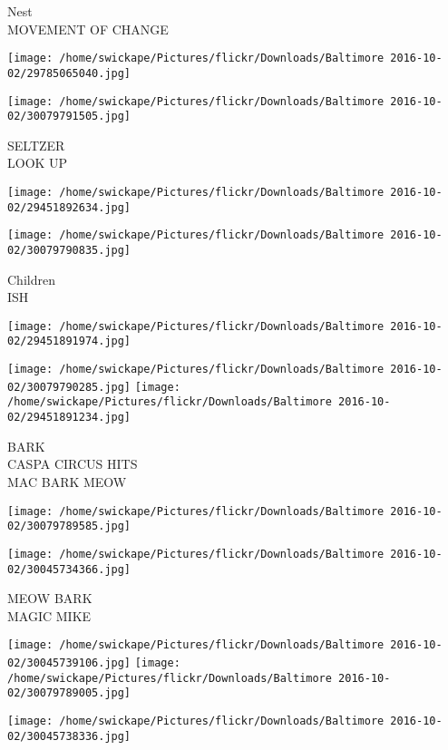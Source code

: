 \documentclass[10pt,letterpaper]{article}
\begin{document}
Nest\\
MOVEMENT OF CHANGE
\pagebreak

\texttt{[image: /home/swickape/Pictures/flickr/Downloads/Baltimore 2016-10-02/29785065040.jpg]}

\vspace{0.25in}
\texttt{[image: /home/swickape/Pictures/flickr/Downloads/Baltimore 2016-10-02/30079791505.jpg]}

SELTZER\\
LOOK UP
\pagebreak

\texttt{[image: /home/swickape/Pictures/flickr/Downloads/Baltimore 2016-10-02/29451892634.jpg]}

\vspace{0.25in}
\texttt{[image: /home/swickape/Pictures/flickr/Downloads/Baltimore 2016-10-02/30079790835.jpg]}

Children\\
ISH
\pagebreak

\texttt{[image: /home/swickape/Pictures/flickr/Downloads/Baltimore 2016-10-02/29451891974.jpg]}

\vspace{0.25in}
\texttt{[image: /home/swickape/Pictures/flickr/Downloads/Baltimore 2016-10-02/30079790285.jpg]}
\texttt{[image: /home/swickape/Pictures/flickr/Downloads/Baltimore 2016-10-02/29451891234.jpg]}

BARK\\
CASPA CIRCUS HITS\\
MAC BARK MEOW
\pagebreak

\texttt{[image: /home/swickape/Pictures/flickr/Downloads/Baltimore 2016-10-02/30079789585.jpg]}

\vspace{0.25in}
\texttt{[image: /home/swickape/Pictures/flickr/Downloads/Baltimore 2016-10-02/30045734366.jpg]}

MEOW BARK\\
MAGIC MIKE
\pagebreak

\texttt{[image: /home/swickape/Pictures/flickr/Downloads/Baltimore 2016-10-02/30045739106.jpg]}
\texttt{[image: /home/swickape/Pictures/flickr/Downloads/Baltimore 2016-10-02/30079789005.jpg]}

\texttt{[image: /home/swickape/Pictures/flickr/Downloads/Baltimore 2016-10-02/30045738336.jpg]}
\end{document}
